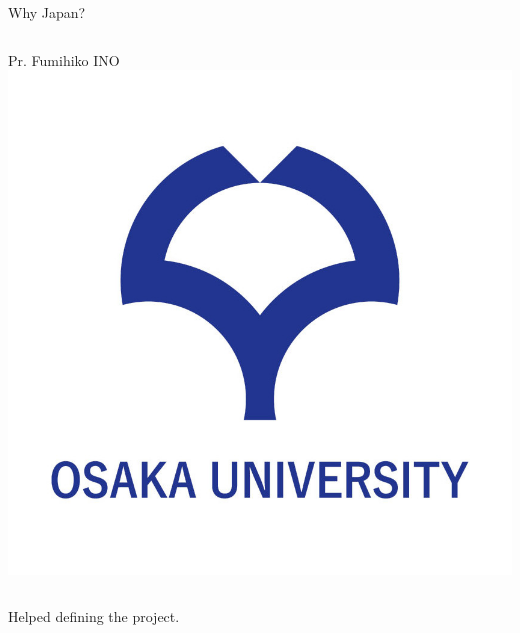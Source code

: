 \begin{frame}{Why Japan?}
\begin{columns}
	\hfill Pr. Fumihiko INO
	\includegraphics[width=1\textwidth]{osaka_university}
	\end{columns}
	


	
	Helped defining the project.
	
\end{frame}